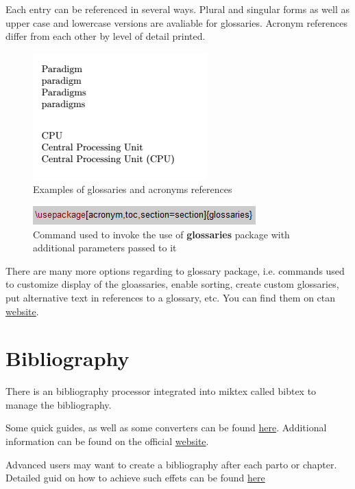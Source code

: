 Each entry can be referenced in several ways. Plural and singular forms as well as upper case and lowercase versions are avaliable for glossaries. Acronym references differ from each other by level of detail printed.

\begin{figure}[H]
\centering
\includegraphics[scale=1.0]{content/LaTeX/figures/glossary_calls.png}
\caption{Examples of glossaries and acronyms references}
\end{figure}

\begin{figure}[H]
\centering
\includegraphics[scale=1.0]{content/LaTeX/figures/usepackage_glossaries.png}
\caption{Command used to invoke the use of \textbf{glossaries} package with additional parameters passed to it}
\label{fig:usepackage_glossaries}
\end{figure}

There are many more options regarding to glossary package, i.e. commands used to customize display of the gloassaries, enable sorting, create custom glossaries, put alternative text in references to a glossary, etc. You can find them on \acrshort{ctan} \href{https://www.ctan.org/pkg/glossaries}{website}.

\section{Bibliography}

There is an bibliography processor integrated into \Gls{miktex} called \Gls{bibtex} to manage the bibliography.

Some quick guides, as well as some converters can be found \href{https://www.bibtex.com/g/bibtex-format/}{here}. Additional information can be found on the official \href{https://tug.org/bibtex/}{website}.

Advanced users may want to create a bibliography after each parto or chapter. Detailed guid on how to achieve such effets can be found \href{https://tex.stackexchange.com/questions/229846/different-bibliographies-for-each-chapter-with-shared-references}{here}

